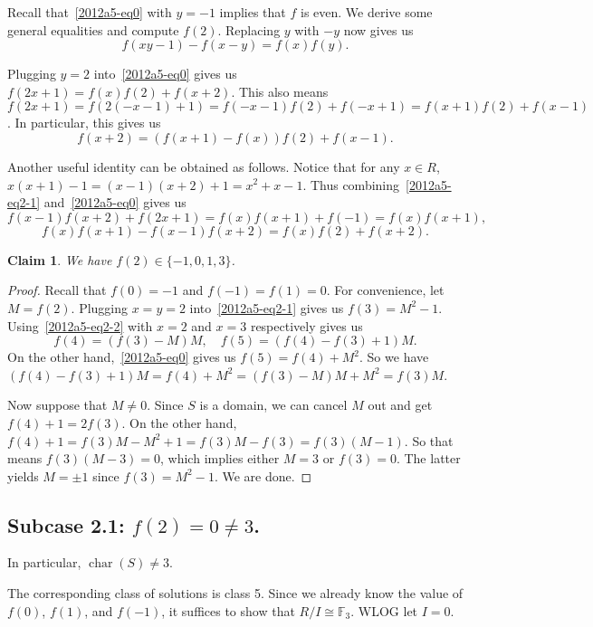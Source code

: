 \documentclass{article}
\newcommand{\F}{\mathbb{F}}
\DeclareMathOperator{\rchar}{char}
\newtheorem*{claim}{Claim}
\begin{document}
Recall that~\eqref{2012a5-eq0} with $y = -1$ implies that $f$ is even.
We derive some general equalities and compute $f(2)$.
Replacing $y$ with $-y$ now gives us
\[ f(xy - 1) - f(x - y) = f(x) f(y). \tag{2.1}\label{2012a5-eq2-1} \]

Plugging $y = 2$ into~\eqref{2012a5-eq0} gives us $f(2x + 1) = f(x) f(2) + f(x + 2)$.
This also means $f(2x + 1) = f(2(-x - 1) + 1) = f(-x - 1) f(2) + f(-x + 1) = f(x + 1) f(2) + f(x - 1)$.
In particular, this gives us
\[ f(x + 2) = (f(x + 1) - f(x)) f(2) + f(x - 1). \tag{2.2}\label{2012a5-eq2-2} \]

Another useful identity can be obtained as follows.
Notice that for any $x \in R$, $x(x + 1) - 1 = (x - 1)(x + 2) + 1 = x^2 + x - 1$.
Thus combining~\eqref{2012a5-eq2-1} and~\eqref{2012a5-eq0} gives us
\[ f(x - 1) f(x + 2) + f(2x + 1) = f(x) f(x + 1) + f(-1) = f(x) f(x + 1), \]
\[ f(x) f(x + 1) - f(x - 1) f(x + 2) = f(x) f(2) + f(x + 2). \tag{2.3}\label{2012a5-eq2-3} \]

\begin{claim}
We have $f(2) \in \{-1, 0, 1, 3\}$.
\end{claim}
\begin{proof}
Recall that $f(0) = -1$ and $f(-1) = f(1) = 0$.
For convenience, let $M = f(2)$.
Plugging $x = y = 2$ into~\eqref{2012a5-eq2-1} gives us $f(3) = M^2 - 1$.
Using~\eqref{2012a5-eq2-2} with $x = 2$ and $x = 3$ respectively gives us
\[ f(4) = (f(3) - M) M, \quad f(5) = (f(4) - f(3) + 1) M. \]
On the other hand,~\eqref{2012a5-eq0} gives us $f(5) = f(4) + M^2$.
So we have $(f(4) - f(3) + 1) M = f(4) + M^2 = (f(3) - M) M + M^2 = f(3) M$.

Now suppose that $M \neq 0$.
Since $S$ is a domain, we can cancel $M$ out and get $f(4) + 1 = 2 f(3)$.
On the other hand, $f(4) + 1 = f(3) M - M^2 + 1 = f(3) M - f(3) = f(3) (M - 1)$.
So that means $f(3) (M - 3) = 0$, which implies either $M = 3$ or $f(3) = 0$.
The latter yields $M = \pm 1$ since $f(3) = M^2 - 1$.
We are done.
\end{proof}


\subsection*{Subcase 2.1: $f(2) = 0 \neq 3$.}

In particular, $\rchar(S) \neq 3$.

The corresponding class of solutions is class 5.
Since we already know the value of $f(0)$, $f(1)$, and $f(-1)$, it suffices to show that $R/I \cong \F_3$.
WLOG let $I = 0$.
\end{document}
